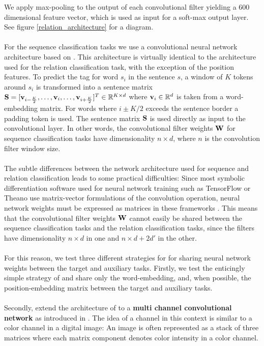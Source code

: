 We apply max-pooling to the output of each convolutional filter yielding a 600 dimensional feature vector, which is used as input for a soft-max output layer. See figure \ref{relation_architecture} for a diagram.
\\\\
For the sequence classification tasks we use a convolutional neural network architecture based on \citet{collobert2011}. This architecture is virtually identical to the architecture used for the relation classification task, with the exception of the position features. To predict the tag for word $s_i$ in the sentence $s$, a window of $K$ tokens around $s_i$ is transformed into a sentence matrix $\mathbf{S} = [\mathbf{v}_{i - \frac{K}{2}},\dots,\mathbf{v}_i,\dots,\mathbf{v}_{i + \frac{K}{2}}]^T \in \mathbb{R}^{K \times d}$ where $\mathbf{v}_i \in \mathbb{R}^d$ is taken from a word-embedding matrix. For words where $i \pm K / 2$ exceeds the sentence border a padding token is used. The sentence matrix $\mathbf{S}$ is used directly as input to the convolutional layer. In other words, the convolutional filter weights $\mathbf{W}$ for sequence classification tasks have dimensionality $n \times d$, where $n$ is the convolution filter window size.
\\\\
The subtle differences between the network architecture used for sequence and relation classification leads to some practical difficulties: Since most symbolic differentiation software used for neural network training such as TensorFlow or Theano use matrix-vector formulations of the convolution operation, neural network weights must be expressed as matrices in these frameworks \citep{abadi2016, theano2016}. This means that the convolutional filter weights $\mathbf{W}$ cannot easily be shared between the sequence classification tasks and the relation classification tasks, since the filters have dimensionality $n \times d$ in one and $n \times d + 2d'$ in the other.
\\\\
For this reason, we test three different strategies for for sharing neural network weights between the target and auxiliary tasks. Firstly, we test the enticingly simple strategy of \citet{collobert2008} and share only the word-embedding, and, when possible, the position-embedding matrix between the target and auxiliary tasks. 
\\\\
Secondly, extend the architecture of \citet{nguyen2015} to a \textbf{multi channel convolutional network} as introduced in \cite{kim2014}. The idea of a channel in this context is similar to a color channel in a digital image: An image is often represented as a stack of three matrices where each matrix component denotes color intensity in a color channel.
